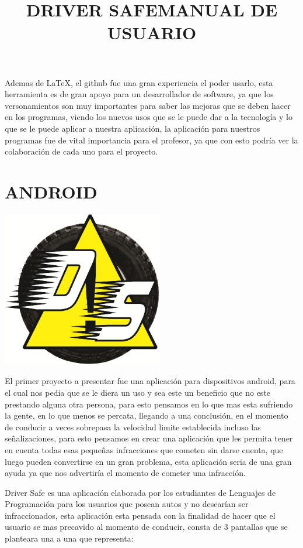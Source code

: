 \documentclass[12pt]{extbook}
\begin{document}
Ademas de \LaTeX, el github fue una gran experiencia
el poder usarlo, esta herramienta es de gran apoyo para un desarrollador
de software, ya que los versonamientos son muy importantes para saber
las mejoras que se deben hacer en los programas, viendo los nuevos
usos que se le puede dar a la tecnología y lo que se le puede aplicar
a nuestra aplicación, la aplicación para nuestros programas fue de
vital importancia para el profesor, ya que con esto podría ver la
colaboración de cada uno para el proyecto.
\chapter{ANDROID}
\begin{center}
\title{\Large{DRIVER SAFE}}\maketitle
\end{center}
\begin{center}
\includegraphics[width=7cm]{driversafe.jpg}
\end{center}
El primer proyecto a presentar fue una aplicación para dispositivos
android, para el cual nos pedia que se le diera un uso y sea este
un beneficio que no este prestando alguna otra persona, para esto
pensamos en lo que mas esta sufriendo la gente, en lo que menos se
percata, llegando a una conclusión, en el momento de conducir a veces
sobrepasa la velocidad limite establecida incluso las señalizaciones,
para esto pensamos en crear una aplicación que les permita tener en
cuenta todas esas pequeñas infracciones que cometen sin darse cuenta,
que luego pueden convertirse en un gran problema, esta aplicación
seria de una gran ayuda ya que nos advertiría el momento de cometer
una infracción.
\newpage
\begin{center}
\title{MANUAL DE USUARIO}\maketitle
\end{center}
Driver Safe es una aplicación elaborada por los estudiantes de Lenguajes
de Programación para los usuarios que posean autos y no desearían
ser infraccionados, esta aplicación esta pensada con la finalidad
de hacer que el usuario se mas precavido al momento de conducir, consta
de 3 pantallas que se planteara una a una que representa: \\
\end{document}
